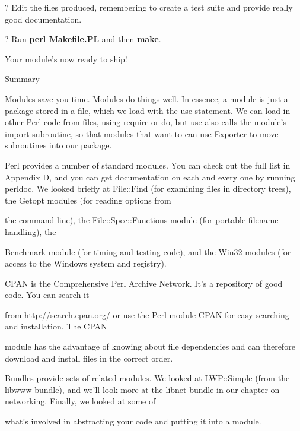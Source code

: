 \documentclass[a4paper,11pt]{book}
\begin{document}
\noindent 

\noindent ? Edit the files produced, remembering to create a test suite and provide really good documentation.

\noindent ? Run \textbf{perl Makefile.PL }and then \textbf{make}.

\noindent 

\noindent Your module's now ready to ship!

\noindent 

\noindent Summary

\noindent 

\noindent Modules save you time. Modules do things well. In essence, a module is just a package stored in a file, which we load with the use statement. We can load in other Perl code from files, using require or do, but use also calls the module's import subroutine, so that modules that want to can use Exporter to move subroutines into our package.

\noindent 

\noindent Perl provides a number of standard modules. You can check out the full list in Appendix D, and you can get documentation on each and every one by running perldoc. We looked briefly at File::Find (for examining files in directory trees), the Getopt modules (for reading options from

\noindent the command line), the File::Spec::Functions module (for portable filename handling), the

\noindent Benchmark module (for timing and testing code), and the Win32 modules (for access to the Windows system and registry).

\noindent 

\noindent CPAN is the Comprehensive Perl Archive Network. It's a repository of good code. You can search it

\noindent from http://search.cpan.org/ or use the Perl module CPAN for easy searching and installation. The CPAN

\noindent module has the advantage of knowing about file dependencies and can therefore download and install files in the correct order.

\noindent 

\noindent Bundles provide sets of related modules. We looked at LWP::Simple (from the libwww bundle), and we'll look more at the libnet bundle in our chapter on networking. Finally, we looked at some of

\noindent what's involved in abstracting your code and putting it into a module.
\end{document}
